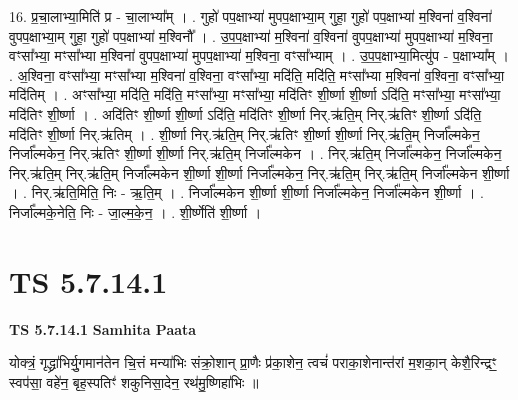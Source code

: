 \documentclass[17pt]{extarticle}
\begin{document}
16. प्र॒चा॒लाभ्या॒मिति॑ प्र - चा॒लाभ्या᳚म् । . गुहो॑ पप॒क्षाभ्या॑ मुपप॒क्षाभ्या॒म् गुहा॒ गुहो॑ पप॒क्षाभ्या॑ म॒श्विना॑ व॒श्विना॑ वुपप॒क्षाभ्या॒म् गुहा॒ गुहो॑ पप॒क्षाभ्या॑ म॒श्विनौ᳚ । . उ॒प॒प॒क्षाभ्या॑ म॒श्विना॑ व॒श्विना॑ वुपप॒क्षाभ्या॑ मुपप॒क्षाभ्या॑ म॒श्विना॒ वꣳसा᳚भ्या॒ मꣳसा᳚भ्या म॒श्विना॑ वुपप॒क्षाभ्या॑ मुपप॒क्षाभ्या॑ म॒श्विना॒ वꣳसा᳚भ्याम् । . उ॒प॒प॒क्षाभ्या॒मित्यु॑प - प॒क्षाभ्या᳚म् । . अ॒श्विना॒ वꣳसा᳚भ्या॒ मꣳसा᳚भ्या म॒श्विना॑ व॒श्विना॒ वꣳसा᳚भ्या॒ मदि॑ति॒ मदि॑ति॒ मꣳसा᳚भ्या म॒श्विना॑ व॒श्विना॒ वꣳसा᳚भ्या॒ मदि॑तिम् । . अꣳसा᳚भ्या॒ मदि॑ति॒ मदि॑ति॒ मꣳसा᳚भ्या॒ मꣳसा᳚भ्या॒ मदि॑तिꣳ शी॒र्ष्णा शी॒र्ष्णा ऽदि॑ति॒ मꣳसा᳚भ्या॒ मꣳसा᳚भ्या॒ मदि॑तिꣳ शी॒र्ष्णा । . अदि॑तिꣳ शी॒र्ष्णा शी॒र्ष्णा ऽदि॑ति॒ मदि॑तिꣳ शी॒र्ष्णा निर्.ऋ॑ति॒म् निर्.ऋ॑तिꣳ शी॒र्ष्णा ऽदि॑ति॒ मदि॑तिꣳ शी॒र्ष्णा निर्.ऋ॑तिम् । . शी॒र्ष्णा निर्.ऋ॑ति॒म् निर्.ऋ॑तिꣳ शी॒र्ष्णा शी॒र्ष्णा निर्.ऋ॑ति॒म् निर्जा᳚ल्मकेन॒ निर्जा᳚ल्मकेन॒ निर्.ऋ॑तिꣳ शी॒र्ष्णा शी॒र्ष्णा निर्.ऋ॑ति॒म् निर्जा᳚ल्मकेन । . निर्.ऋ॑ति॒म् निर्जा᳚ल्मकेन॒ निर्जा᳚ल्मकेन॒ निर्.ऋ॑ति॒म् निर्.ऋ॑ति॒म् निर्जा᳚ल्मकेन शी॒र्ष्णा शी॒र्ष्णा निर्जा᳚ल्मकेन॒ निर्.ऋ॑ति॒म् निर्.ऋ॑ति॒म् निर्जा᳚ल्मकेन शी॒र्ष्णा । . निर्.ऋ॑ति॒मिति॒ निः - ऋ॒ति॒म् । . निर्जा᳚ल्मकेन शी॒र्ष्णा शी॒र्ष्णा निर्जा᳚ल्मकेन॒ निर्जा᳚ल्मकेन शी॒र्ष्णा । . निर्जा᳚ल्मके॒नेति॒ निः - जा॒ल्म॒के॒न॒ । . शी॒र्ष्णेति॑ शी॒र्ष्णा । \newline
\pagebreak
{}

\section{ TS 5.7.14.1 }

\textbf{TS 5.7.14.1 } \newline
\textbf{Samhita Paata} \newline

योक्त्रं॒ गृद्ध्रा॑भिर्यु॒गमान॑तेन चि॒त्तं मन्या॑भिः संक्रो॒शान् प्रा॒णैः प्र॑का॒शेन॒ त्वचं॑ पराका॒शेनान्त॑रां म॒शका॒न् केशै॒रिन्द्रꣳ॒॒ स्वप॑सा॒ वहे॑न॒ बृह॒स्पतिꣳ॑ शकुनिसा॒देन॒ रथ॑मु॒ष्णिहा॑भिः ॥ \newline
\end{document}
